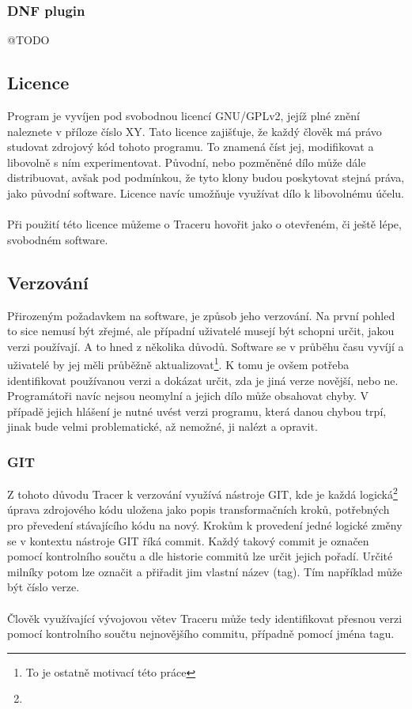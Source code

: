 \documentclass[
  field=inf,
  biblatex,
  glossaries,
  index
]{kidiplom}
\begin{document}
		\subsubsection{DNF plugin}
		@TODO

	\subsection{Licence}
	Program je vyvíjen pod svobodnou licencí GNU/GPLv2, jejíž plné znění naleznete v příloze číslo XY\@. Tato licence zajišťuje, že každý člověk má právo studovat zdrojový kód tohoto programu. To znamená číst jej, modifikovat a libovolně s ním experimentovat. Původní, nebo pozměněné dílo může dále distribuovat, avšak pod podmínkou, že tyto klony budou poskytovat stejná práva, jako původní software. Licence navíc umožňuje využívat dílo k libovolnému účelu.
	\\
	\\
	Při použití této licence můžeme o Traceru hovořit jako o otevřeném, či ještě lépe, svobodném software.

	\subsection{Verzování}
	Přirozeným požadavkem na software, je  způsob jeho verzování. Na první pohled to sice nemusí být zřejmé, ale případní uživatelé musejí být schopni určit, jakou verzi používají. A to hned z několika důvodů. Software se v průběhu času vyvíjí a uživatelé by jej měli průběžně aktualizovat\footnote{To je ostatně motivací této práce}. K tomu je ovšem potřeba identifikovat používanou verzi a dokázat určit, zda je jiná verze novější, nebo ne. Programátoři navíc nejsou neomylní a jejich dílo může obsahovat chyby. V případě jejich hlášení je nutné uvést verzi programu, která danou chybou trpí, jinak bude velmi problematické, až nemožné, ji nalézt a opravit.

		\subsubsection{GIT}
		Z tohoto důvodu Tracer k verzování využívá nástroje GIT, kde je každá logická\footnote{} úprava zdrojového kódu uložena jako popis transformačních kroků, potřebných pro převedení stávajícího kódu na nový. Krokům k provedení jedné logické změny se v kontextu nástroje GIT říká commit. Každý takový commit je označen pomocí kontrolního součtu a dle historie commitů lze určit jejich pořadí. Určité milníky potom lze označit a přiřadit jim vlastní název (tag). Tím například může být číslo verze.
		\\
		\\
		Člověk využívající vývojovou větev Traceru může tedy identifikovat přesnou verzi pomocí kontrolního součtu nejnovějšího commitu, případně pomocí jména tagu.
\end{document}

